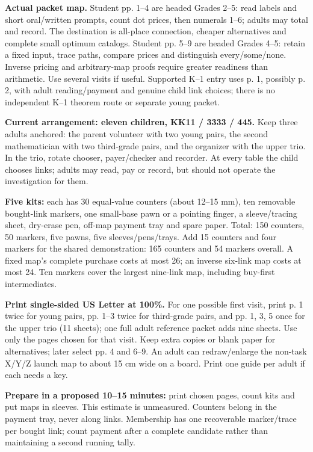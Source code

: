 \documentclass[11pt,letterpaper]{article}
\newcommand\topic[1]{\par\vspace{5pt}{\large\bfseries #1}\par}
\begin{document}
\textbf{Actual packet map.} Student pp. 1--4 are headed Grades 2--5: read labels and short oral/written prompts, count dot prices, then numerals 1--6; adults may total and record. The destination is all-place connection, cheaper alternatives and complete small optimum catalogs. Student pp. 5--9 are headed Grades 4--5: retain a fixed input, trace paths, compare prices and distinguish every/some/none. Inverse pricing and arbitrary-map proofs require greater readiness than arithmetic. Use several visits if useful. Supported K--1 entry uses p. 1, possibly p. 2, with adult reading/payment and genuine child link choices; there is no independent K--1 theorem route or separate young packet.
\newpage

\topic{Preparation, staffing and launch}
\textbf{Current arrangement: eleven children, KK11 / 3333 / 445.} Keep three adults anchored: the parent volunteer with two young pairs, the second mathematician with two third-grade pairs, and the organizer with the upper trio. In the trio, rotate chooser, payer/checker and recorder. At every table the child chooses links; adults may read, pay or record, but should not operate the investigation for them.

\textbf{Five kits:} each has 30 equal-value counters (about 12--15 mm), ten removable bought-link markers, one small-base pawn or a pointing finger, a sleeve/tracing sheet, dry-erase pen, off-map payment tray and spare paper. Total: 150 counters, 50 markers, five pawns, five sleeves/pens/trays. Add 15 counters and four markers for the shared demonstration: 165 counters and 54 markers overall. A fixed map's complete purchase costs at most 26; an inverse six-link map costs at most 24. Ten markers cover the largest nine-link map, including buy-first intermediates.

\textbf{Print single-sided US Letter at 100\%.} For one possible first visit, print p. 1 twice for young pairs, pp. 1--3 twice for third-grade pairs, and pp. 1, 3, 5 once for the upper trio (11 sheets); one full adult reference packet adds nine sheets. Use only the pages chosen for that visit. Keep extra copies or blank paper for alternatives; later select pp. 4 and 6--9. An adult can redraw/enlarge the non-task X/Y/Z launch map to about 15 cm wide on a board. Print one guide per adult if each needs a key.

\textbf{Prepare in a proposed 10--15 minutes:} print chosen pages, count kits and put maps in sleeves. This estimate is unmeasured. Counters belong in the payment tray, never along links. Membership has one recoverable marker/trace per bought link; count payment after a complete candidate rather than maintaining a second running tally.
\end{document}

